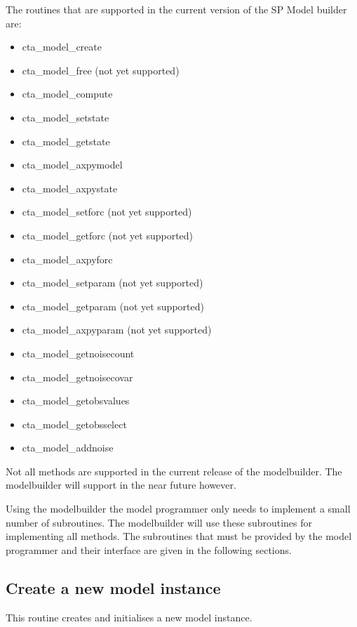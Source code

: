 The routines that are supported in the current version of the SP Model
builder are:
\begin{itemize}
\item cta\_model\_create
\item cta\_model\_free (not yet supported)
\item cta\_model\_compute
\item cta\_model\_setstate
\item cta\_model\_getstate
\item cta\_model\_axpymodel
\item cta\_model\_axpystate
\item cta\_model\_setforc   (not yet supported)
\item cta\_model\_getforc   (not yet supported)
\item cta\_model\_axpyforc
\item cta\_model\_setparam  (not yet supported)
\item cta\_model\_getparam  (not yet supported)
\item cta\_model\_axpyparam (not yet supported)
\item cta\_model\_getnoisecount
\item cta\_model\_getnoisecovar
\item cta\_model\_getobsvalues
\item cta\_model\_getobsselect
\item cta\_model\_addnoise 
\end{itemize}

Not all methods are supported in the current release of the modelbuilder.
The modelbuilder will support in the near future however.

Using the modelbuilder the model programmer only needs to implement a small
number of subroutines. The modelbuilder will use these subroutines for
implementing all methods. The subroutines that must be provided by the
model programmer and their interface are given in the following sections.

\subsection{Create a new model instance}
This routine creates and initialises a new model instance.

